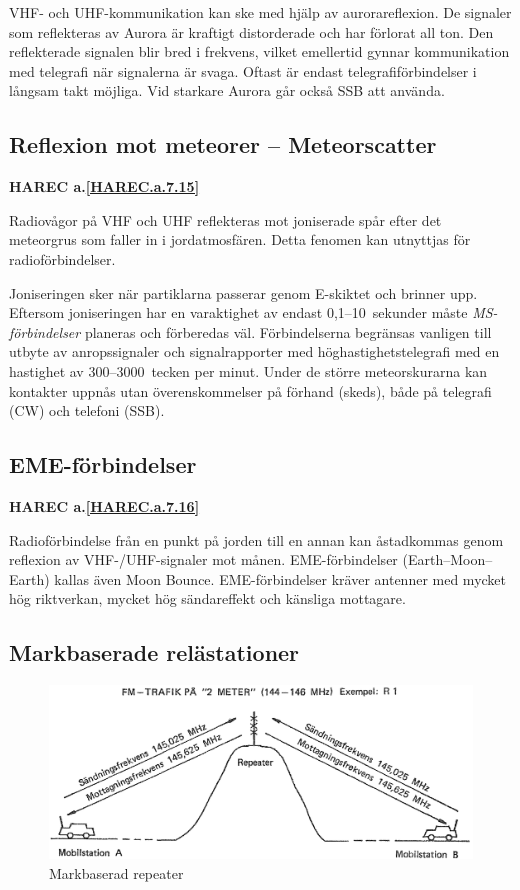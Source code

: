 VHF- och UHF-kommunikation kan ske med hjälp av aurorareflexion. De
signaler som reflekteras av Aurora är kraftigt distorderade och har
förlorat all ton. Den reflekterade signalen blir bred i frekvens,
vilket emellertid gynnar kommunikation med telegrafi när signalerna är
svaga. Oftast är endast telegrafiförbindelser i långsam takt möjliga.
Vid starkare Aurora går också SSB att använda.

\subsection{Reflexion mot meteorer -- Meteorscatter}
\textbf{
HAREC a.\ref{HAREC.a.7.15}\label{myHAREC.a.7.15}
}

Radiovågor på VHF och UHF reflekteras mot joniserade spår efter det
meteorgrus som faller in i jordatmosfären. Detta fenomen kan utnyttjas
för radioförbindelser.

Joniseringen sker när partiklarna passerar genom E-skiktet och brinner upp.
Eftersom joniseringen har en varaktighet av endast 0,1--10~sekunder måste
\emph{MS-förbindelser} planeras och förberedas väl.
Förbindelserna begränsas vanligen till utbyte av anropssignaler och
signalrapporter med höghastighetstelegrafi med en hastighet av
300--3000~tecken per minut.
Under de större meteorskurarna kan kontakter uppnås utan överenskommelser på
förhand (skeds), både på telegrafi (CW) och telefoni (SSB).

\subsection{EME-förbindelser}
\textbf{
HAREC a.\ref{HAREC.a.7.16}\label{myHAREC.a.7.16}
}

Radioförbindelse från en punkt på jorden till en annan kan åstadkommas
genom reflexion av VHF-/UHF-signaler mot månen. EME-förbindelser
(Earth--Moon--Earth) kallas även Moon Bounce. EME-förbindelser kräver
antenner med mycket hög riktverkan, mycket hög sändareffekt och
känsliga mottagare.

\subsection{Markbaserade relästationer}

\begin{figure}
  \includegraphics[width=\textwidth]{images/cropped_pdfs/bild_2_7-12.pdf}
  \caption{Markbaserad repeater}
  \label{fig:bildII7-12}
\end{figure}


